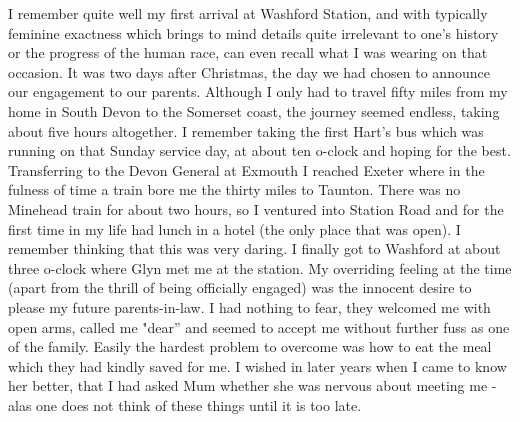 I remember quite well my first arrival at Washford Station, and with typically feminine exactness which brings to mind details quite irrelevant to one's history or the progress of the human race, can even recall what I was wearing on that occasion. It was two days after Christmas, the day we had chosen to announce our engagement to our parents. Although I only had to travel fifty miles from my home in South Devon to the Somerset coast, the journey seemed endless, taking about five hours altogether. I remember taking the first Hart's bus which was running on that Sunday service day, at about ten o-clock and hoping for the best. Transferring to the Devon General at Exmouth I reached Exeter where in the fulness of time a train bore me the thirty miles to Taunton. There was no Minehead train for about two hours, so I ventured into Station Road and for the first time in my life had lunch in a hotel (the only place that was open). I remember thinking that this was very daring. I finally got to Washford at about three o-clock where Glyn met me at the station. My overriding feeling at the time (apart from the thrill of being officially engaged) was the innocent desire to please my future parents-in-law. I had nothing to fear, they welcomed me with open arms, called me "dear” and seemed to accept me without further fuss as one of the family. Easily the hardest problem to overcome was how to eat the meal which they had kindly saved for me. I wished in later years when I came to know her better, that I had asked Mum whether she was nervous about meeting me - alas one does not think of these things until it is too late.